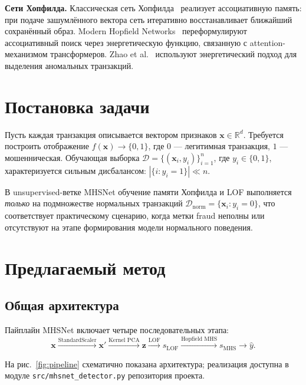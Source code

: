 \documentclass[12pt,a4paper]{article}
\begin{document}
\textbf{Сети Хопфилда.}
Классическая сеть Хопфилда~\cite{hopfield1982} реализует ассоциативную память: при подаче зашумлённого
вектора сеть итеративно восстанавливает ближайший сохранённый образ.
Modern Hopfield Networks~\cite{ramsbauer2021} переформулируют ассоциативный поиск через энергетическую
функцию, связанную с attention-механизмом трансформеров.
Zhao et al.~\cite{zhao2025mhsnet} используют энергетический подход для выделения аномальных транзакций.

\section{Постановка задачи}
\label{sec:problem}

Пусть каждая транзакция описывается вектором признаков $\mathbf{x} \in \mathbb{R}^d$.
Требуется построить отображение $f(\mathbf{x}) \to \{0,1\}$, где $0$ --- легитимная транзакция,
$1$ --- мошенническая. Обучающая выборка $\mathcal{D} = \{(\mathbf{x}_i, y_i)\}_{i=1}^{n}$,
где $y_i \in \{0,1\}$, характеризуется сильным дисбалансом: $|\{i: y_i=1\}| \ll n$.

В unsupervised-ветке MHSNet обучение памяти Хопфилда и LOF выполняется \textit{только} на подмножестве
нормальных транзакций $\mathcal{D}_{\mathrm{norm}} = \{\mathbf{x}_i : y_i = 0\}$,
что соответствует практическому сценарию, когда метки fraud неполны или отсутствуют на этапе
формирования модели нормального поведения.

\section{Предлагаемый метод}
\label{sec:method}

\subsection{Общая архитектура}

Пайплайн MHSNet включает четыре последовательных этапа:
\begin{equation}
  \mathbf{x}
  \xrightarrow{\text{StandardScaler}}
  \mathbf{x}'
  \xrightarrow{\text{Kernel PCA}}
  \mathbf{z}
  \xrightarrow{\text{LOF}}
  s_{\mathrm{LOF}}
  \xrightarrow{\text{Hopfield MHS}}
  s_{\mathrm{MHS}}
  \rightarrow \hat{y}.
\end{equation}

На рис.~\ref{fig:pipeline} схематично показана архитектура; реализация доступна в модуле
\texttt{src/mhsnet\_detector.py} репозитория проекта.
\end{document}
